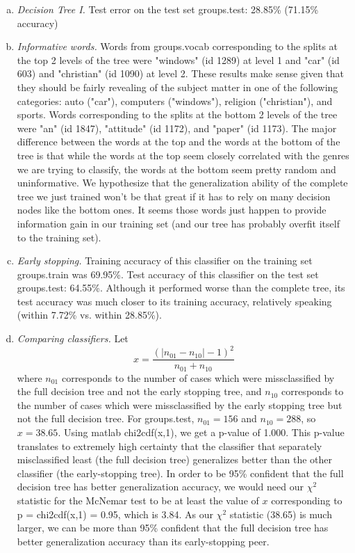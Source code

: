 \documentclass{article}
\begin{document}
\begin{enumerate}[(a)]
\item \emph{Decision Tree I.} Test error on the test set groups.test: 28.85\% (71.15\% accuracy)
\item \emph{Informative words.} Words from groups.vocab corresponding to the splits at the top 2 levels of the tree were "windows" (id 1289) at level 1 and "car" (id 603) and "christian" (id 1090) at level 2. These results make sense given that they should be fairly revealing of the subject matter in one of the following categories: auto ("car"), computers ("windows"), religion ("christian"), and sports. Words corresponding to the splits at the bottom 2 levels of the tree were "an" (id 1847), "attitude" (id 1172), and "paper" (id 1173). The major difference between the words at the top and the words at the bottom of the tree is that while the words at the top seem closely correlated with the genres we are trying to classify, the words at the bottom seem pretty random and uninformative. We hypothesize that the generalization ability of the complete tree we just trained won't be that great if it has to rely on many decision nodes like the bottom ones. It seems those words just happen to provide information gain in our training set (and our tree has probably overfit itself to the training set).
\item \emph{Early stopping.} Training accuracy of this classifier on the training set groups.train was 69.95\%. Test accuracy of this classifier on the test set groups.test: 64.55\%. Although it performed worse than the complete tree, its test accuracy was much closer to its training accuracy, relatively speaking (within 7.72\% vs. within 28.85\%).
\item \emph{Comparing classifiers.} Let \[x=\frac{(|n_{01}-n_{10}|-1)^2}{n_{01}+n_{10}}\]
 where $n_{01}$ corresponds to the number of cases which were missclassified by the full decision tree and not the early stopping tree, and $n_{10}$ corresponds to the number of cases which were missclassified by the early stopping tree but not the full decision tree. For groups.test, $n_{01}=156$ and $n_{10}=288$, so $x=38.65$. Using matlab chi2cdf(x,1), we get a p-value of 1.000. This p-value translates to extremely high certainty that the classifier that separately misclassified least (the full decision tree) generalizes better than the other classifier (the early-stopping tree). In order to be 95\% confident that the full decision tree has better generalization accuracy, we would need our $\chi^2$ statistic for the McNemar test to be at least the value of $x$ corresponding to p = chi2cdf(x,1) = 0.95, which is 3.84. As our  $\chi^2$ statistic (38.65) is much larger, we can be more than 95\% confident that the full decision tree has better generalization accuracy than its early-stopping peer.

\end{enumerate}
\end{document}
